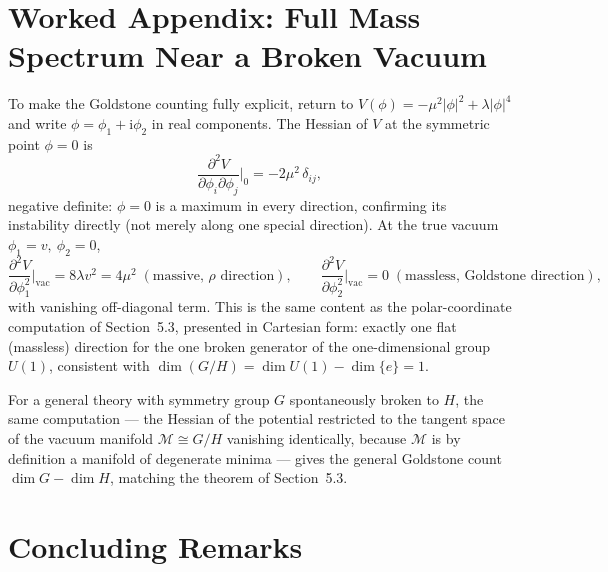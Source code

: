 \documentclass[11pt]{article}
\theoremstyle{definition}
\theoremstyle{remark}
\newcommand{\ii}{\mathrm{i}}
\newcommand{\pdv}[2]{\dfrac{\partial #1}{\partial #2}}
\begin{document}
\section{Worked Appendix: Full Mass Spectrum Near a Broken Vacuum}

To make the Goldstone counting fully explicit, return to $V(\phi) = -\mu^2|\phi|^2+\lambda|\phi|^4$ and write $\phi = \phi_1+\ii\phi_2$ in real components. The Hessian of $V$ at the symmetric point $\phi=0$ is
\[
\pdv{^2V}{\phi_i\partial\phi_j}\Big|_{0} = -2\mu^2\,\delta_{ij},
\]
negative definite: $\phi=0$ is a maximum in every direction, confirming its instability directly (not merely along one special direction). At the true vacuum $\phi_1=v,\ \phi_2=0$,
\[
\pdv{^2V}{\phi_1^2}\Big|_{\text{vac}} = 8\lambda v^2 = 4\mu^2 \;(\text{massive, } \rho \text{ direction}), \qquad
\pdv{^2V}{\phi_2^2}\Big|_{\text{vac}} = 0 \;(\text{massless, Goldstone direction}),
\]
with vanishing off-diagonal term. This is the same content as the polar-coordinate computation of Section~5.3, presented in Cartesian form: exactly one flat (massless) direction for the one broken generator of the one-dimensional group $U(1)$, consistent with $\dim(G/H) = \dim U(1) - \dim\{e\} = 1$.

For a general theory with symmetry group $G$ spontaneously broken to $H$, the same computation — the Hessian of the potential restricted to the tangent space of the vacuum manifold $\mathcal M \cong G/H$ vanishing identically, because $\mathcal M$ is by definition a manifold of degenerate minima — gives the general Goldstone count $\dim G - \dim H$, matching the theorem of Section~5.3.

\section{Concluding Remarks}
\end{document}
